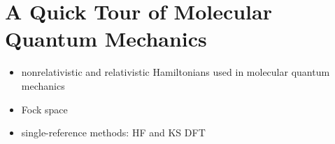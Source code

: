 \chapter{A Quick Tour of Molecular Quantum Mechanics}\label{ch:QM}

\begin{itemize}
  \item nonrelativistic and relativistic Hamiltonians used in molecular
    quantum mechanics
  \item Fock space
  \item single-reference methods: \ac{HF} and \ac{KS} \ac{DFT}
\end{itemize}

